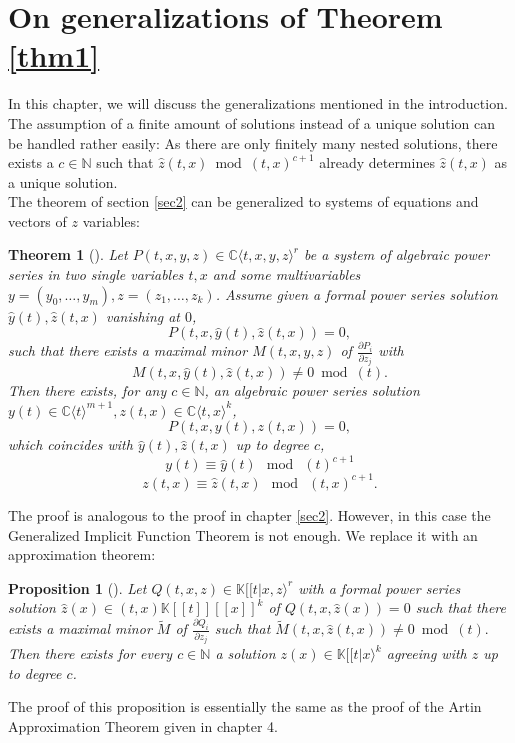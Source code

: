 \documentclass[10pt, a4paper]{article}
\newtheorem{theorem}{Theorem}[section]
\def\wh{\widehat}
\newtheorem{proposition}{Proposition}[section]
\theoremstyle{remark}
\theoremstyle{remark}
\begin{document}
\section{On generalizations of Theorem \ref{thm1}}\label{sec gen}
In this chapter, we will discuss the generalizations mentioned in the introduction. 
The assumption of a finite amount of solutions instead of a unique solution can be handled rather easily: As there are only finitely many nested solutions, there exists a $c\in\mathbb{N}$ such that $\wh{z}(t,x)\bmod(t,x)^{c+1}$ already determines $\wh{z}(t,x)$ as a unique solution.
\\The theorem of section \ref{sec2} can be generalized to systems of equations and vectors of $z$ variables:
\begin{theorem}[\cite{Denef1980}]
Let $P(t,x,y,z)\in \mathbb{C}\langle t,x,y,z\rangle^r$ be a system of
algebraic power series in two single variables $t,x$ and some multivariables $y=(y_0,\ldots,y_m),z=(z_1,\ldots,z_k)$. Assume given a formal power series solution $\widehat{y}(t),\wh{z}(t,x)$ vanishing at $0$,
$$P(t,x,\wh{y}(t),\wh{z}(t,x))= 0,$$
such that there exists a maximal minor $M(t,x,y,z)$ of $\frac{\partial P_i}{\partial z_j}$ with $$M(t,x,\widehat{y}(t),\widehat{z}(t,x)) \neq0\bmod (t).$$
Then there exists, for any $c \in \mathbb{N}$, an algebraic
power series solution $y(t)\in \mathbb{C}\langle t\rangle^{m+1},z(t,x)\in\mathbb{C}\langle t,x\rangle^k$,$$P(t,x, y(t)
,z(t,x)) = 0,$$
which coincides with $\wh{y}(t),\wh{z}(t,x)$ up to degree $c$,
$$y(t)\equiv \wh{y}(t) \: \bmod \:(t)^{c+1}$$
$$z(t,x)\equiv \wh{z}(t,x) \: \bmod \:(t,x)^{c+1}.$$
\end{theorem}
\noindent The proof is analogous to the proof in chapter \ref{sec2}. However, in this case the Generalized Implicit Function Theorem  is not enough. We replace it with an approximation theorem:
\begin{proposition}[\cite{Denef1980}]
  Let $Q(t,x,z)\in\mathbb{K}[[t\vert x,z\rangle^r$ with a formal power series  solution $\wh{z}(x)\in (t,x)\mathbb{K}[[t]][[x]]^k$ of $Q(t,x,\wh{z}(x))=0$ such that there exists a maximal minor $\widetilde{M}$ of $\frac{\partial Q_i}{\partial z_j}$ such that $\widetilde{M}(t,x,\wh{z}(t,x))\neq0\bmod (t).$ Then there exists for every $c\in \mathbb{N}$ a solution $z(x)\in \mathbb{K}[[t\vert x\rangle^k$ agreeing with $\wh{z}$ up to degree $c$.      
\end{proposition}
\noindent The proof of this proposition is essentially the same as the proof of the Artin Approximation Theorem given in chapter 4. 
\end{document}

